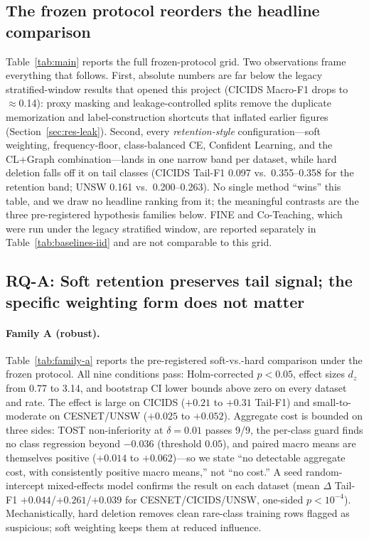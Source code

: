 \documentclass[pdflatex,referee,lineno,sn-basic,Numbered]{sn-jnl}
\begin{document}
\subsection{The frozen protocol reorders the headline comparison}
\label{sec:res-aggregate}
Table~\ref{tab:main} reports the full frozen-protocol grid. Two observations
frame everything that follows. First, absolute numbers are far below the
legacy stratified-window results that opened this project (CICIDS Macro-F1
drops to $\approx$0.14): proxy masking and leakage-controlled splits remove the
duplicate memorization and label-construction shortcuts that inflated earlier
figures (Section~\ref{sec:res-leak}). Second, every \emph{retention-style}
configuration---soft weighting, frequency-floor, class-balanced CE, Confident
Learning, and the CL{+}Graph combination---lands in one narrow band per
dataset, while hard deletion falls off it on tail classes (CICIDS Tail-F1
0.097 vs.\ 0.355--0.358 for the retention band; UNSW 0.161 vs.\
0.200--0.263). No single method ``wins'' this table, and we draw no headline
ranking from it; the meaningful contrasts are the three pre-registered
hypothesis families below. FINE and Co-Teaching, which were run under the
legacy stratified window, are reported separately in
Table~\ref{tab:baselines-iid} and are not comparable to this grid.




\subsection{RQ-A: Soft retention preserves tail signal; the specific weighting form does not matter}
\label{sec:res-tail}
\paragraph{Family A (robust).}
Table~\ref{tab:family-a} reports the pre-registered soft-vs.-hard comparison
under the frozen protocol. All nine conditions pass: Holm-corrected $p<0.05$,
effect sizes $d_z$ from 0.77 to 3.14, and bootstrap CI lower bounds above zero
on every dataset and rate. The effect is large on CICIDS ($+0.21$ to $+0.31$
Tail-F1) and small-to-moderate on CESNET/UNSW ($+0.025$ to $+0.052$). Aggregate
cost is bounded on three sides: TOST non-inferiority at $\delta{=}0.01$ passes
9/9, the per-class guard finds no class regression beyond $-0.036$
(threshold $0.05$), and paired macro means are themselves positive
($+0.014$ to $+0.062$)---so we state ``no detectable aggregate cost, with
consistently positive macro means,'' not ``no cost.'' A seed random-intercept
mixed-effects model confirms the result on each dataset (mean $\Delta$ Tail-F1
$+0.044$/$+0.261$/$+0.039$ for CESNET/CICIDS/UNSW, one-sided $p<10^{-4}$).
Mechanistically, hard deletion removes clean rare-class training rows flagged
as suspicious; soft weighting keeps them at reduced influence.
\end{document}
